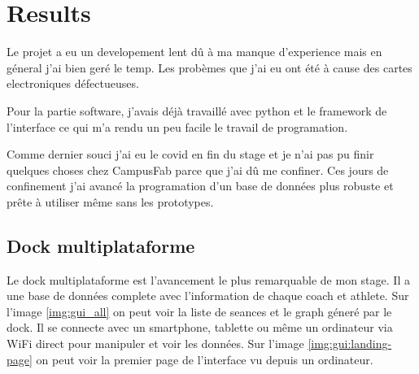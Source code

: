 \documentclass[12pt]{article}
\begin{document}
\section{Results}
\begin{par}
	Le projet a eu un developement lent dû à ma manque
	d'experience mais en géneral j'ai bien ger\'e le temp.
	Les prob\`emes que j'ai eu ont \'et\'e \`a cause 
	des cartes electroniques d\'efectueuses.
\end{par}
\begin{par}
	Pour la partie software, j'avais d\'ej\`a 
	travaill\'e avec python et le framework de l'interface
	ce qui m'a rendu un peu facile le travail de 
	programation.
\end{par}
\begin{par}
	Comme dernier souci j'ai eu le covid en fin du 
	stage et je n'ai pas pu finir quelques choses chez
	CampusFab parce que j'ai dû me confiner. Ces jours de
	confinement j'ai avanc\'e la programation d'un
	base de donn\'ees plus robuste et pr\^ete \`a 
	utiliser m\^eme sans les prototypes.
\end{par}


\subsection{Dock multiplataforme}

\begin{par}
	Le dock multiplataforme est 
	l'avancement le plus remarquable de mon stage. Il 
	a une base de donn\'ees complete avec l'information
	de chaque coach et athlete. Sur l'image \ref{img:gui_all}
	on peut voir la liste de seances et le graph g\'ener\'e
	par le dock.
	Il se connecte avec 
	un smartphone, tablette ou m\^eme un ordinateur via
	WiFi direct pour manipuler et voir les donn\'ees.
	Sur l'image \ref{img:gui:landing-page} on peut voir
	la premier page de l'interface vu depuis un 
	ordinateur.
\end{par}
\end{document}
